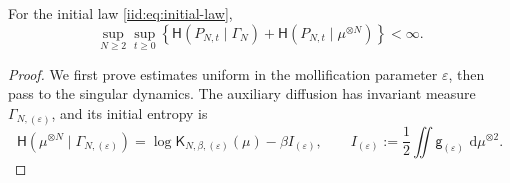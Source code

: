 \documentclass[11pt,reqno]{amsart}
\numberwithin{equation}{section}
\theoremstyle{plain}
\theoremstyle{remark}
\newcommand{\K}{\mathsf K}\newcommand{\g}{\mathsf g}\newcommand{\Fr}{\mathsf F}
\newcommand{\Hr}{\mathsf H}\newcommand{\dd}{\,\mathrm d}
\begin{document}
\begin{lemma}\label{iid:lem:entropy}
For the initial law \eqref{iid:eq:initial-law},
\begin{equation}\label{iid:eq:entropy-both}
 \sup_{N\ge2}\sup_{t\ge0}
 \left\{\Hr(P_{N,t}\mid\Gamma_N)+\Hr(P_{N,t}\mid\mu^{\otimes N})\right\}<\infty.
\end{equation}
\end{lemma}
\begin{proof}
We first prove estimates uniform in the mollification parameter $\varepsilon$, then pass to the singular dynamics. The auxiliary diffusion has invariant measure $\Gamma_{N,(\varepsilon)}$, and its initial entropy is
\begin{equation}\label{iid:eq:initial-entropy}
 \Hr(\mu^{\otimes N}\mid\Gamma_{N,(\varepsilon)})
 =\log\K_{N,\beta,(\varepsilon)}(\mu)-\beta I_{(\varepsilon)},
 \qquad I_{(\varepsilon)}:=\frac12\iint\g_{(\varepsilon)}\,\dd\mu^{\otimes2}.
\end{equation}


\end{proof}
\end{document}
